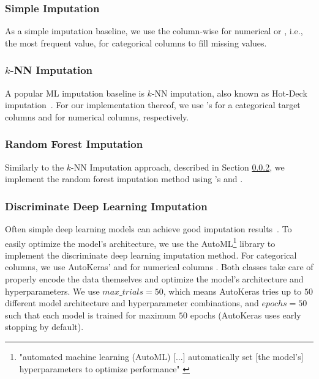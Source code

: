 \subsubsection{Simple Imputation}
\label{sec:simple_imputation}
%
As a simple imputation baseline, we use the column-wise  for numerical or , i.e., the most frequent value,  for categorical columns to fill missing values.


\subsubsection{$k$-NN Imputation}
\label{sec:knKNN}
%
A popular ML imputation baseline is $k$-NN imputation, also known as Hot-Deck imputation~\citep{Batista2003}. For our implementation thereof, we use 's  for a categorical target columns and  for numerical columns, respectively.


\subsubsection{Random Forest Imputation}
%
Similarly to the $k$-NN Imputation approach, described in Section \ref{sec:knKNN}, we implement the random forest imputation method using 's  and .



\subsubsection{Discriminate Deep Learning Imputation}
\label{sec:dl_imputation}
%
Often simple deep learning models can achieve good imputation results~\citep{Biessmann2018a}. To easily optimize the model's architecture, we use the AutoML\footnote{"automated machine learning (AutoML) [...] automatically set [the model's] hyperparameters to optimize performance" \cite{AutoML}} library  \citep{AutoKeras} to implement the discriminate deep learning imputation method.
For categorical columns, we use AutoKeras'  and for numerical columns . Both classes take care of properly encode the data themselves and optimize the model's architecture and hyperparameters. We use $max\_trials = 50$, which means AutoKeras tries up to $50$ different model architecture and hyperparameter combinations, and $epochs = 50$ such that each model is trained for maximum $50$ epochs (AutoKeras uses early stopping by default).


